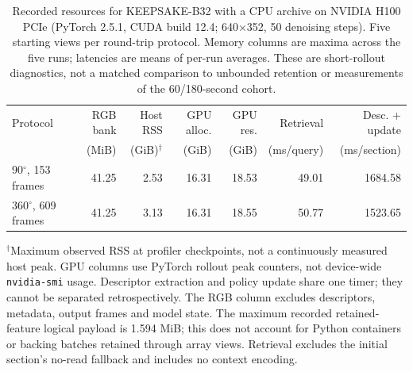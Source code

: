 \begin{table}[t]
\centering\small
\setlength{\tabcolsep}{4pt}
\caption{Recorded resources for KEEPSAKE-B32 with a CPU archive on NVIDIA H100 PCIe (PyTorch 2.5.1, CUDA build 12.4; 640$\times$352, 50 denoising steps). Five starting views per round-trip protocol. Memory columns are maxima across the five runs; latencies are means of per-run averages. These are short-rollout diagnostics, not a matched comparison to unbounded retention or measurements of the 60/180-second cohort.}
\label{tab:memcam-recorded-resources}
\begin{tabular}{lrrrrrr}
\toprule
Protocol & RGB bank & Host RSS & GPU alloc. & GPU res. & Retrieval & Desc. + update \\
 & (MiB) & (GiB)$^\dagger$ & (GiB) & (GiB) & (ms/query) & (ms/section) \\
\midrule
90$^\circ$, 153 frames & 41.25 & 2.53 & 16.31 & 18.53 & 49.01 & 1684.58 \\
360$^\circ$, 609 frames & 41.25 & 3.13 & 16.31 & 18.55 & 50.77 & 1523.65 \\
\bottomrule
\end{tabular}
\par\smallskip
\begin{minipage}{\linewidth}\footnotesize
$^\dagger$Maximum observed RSS at profiler checkpoints, not a continuously measured host peak. GPU columns use PyTorch rollout peak counters, not device-wide \texttt{nvidia-smi} usage. Descriptor extraction and policy update share one timer; they cannot be separated retrospectively. The RGB column excludes descriptors, metadata, output frames and model state. The maximum recorded retained-feature logical payload is 1.594 MiB; this does not account for Python containers or backing batches retained through array views. Retrieval excludes the initial section's no-read fallback and includes no context encoding.
\end{minipage}
\end{table}
